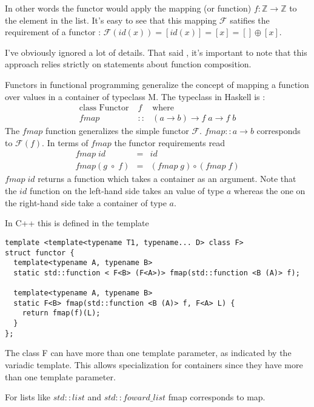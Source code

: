 \documentclass[12pt,fleqn]{article}
\begin{document}
In other words the functor would apply the mapping (or function) $f : \mathbb{Z} \rightarrow \mathbb{Z}$ to the element in the list.
It's easy to see that this mapping $\mathcal{F}$ satifies the requirement of a functor : $\mathcal{F} (id(x)) = [id(x)] = [x] = [] \oplus [x]$.


I've obviously ignored a lot of details.
That said , it's important to note that this approach relies strictly on statements about function composition.
 

Functors in functional programming generalize the concept of mapping a function over values in a container of typeclass M.
The typeclass in Haskell is :
\begin{eqnarray*}
\mbox{class Functor}\; &f& \mbox{where} \\
fmap &::& (a \rightarrow b) \rightarrow f\;a \rightarrow f\;b
\end{eqnarray*}
The $fmap$ function generalizes the simple functor $\mathcal{F}$. 
$fmap::a \rightarrow b$ corresponds to $\mathcal{F}(f)$.
In terms of $fmap$ the functor requirements read 
\begin{eqnarray*}
fmap \; id &=& id  \\
fmap (g \; \circ \; f) &=& (fmap \;g) \circ (fmap \;f) 
\end{eqnarray*}
$fmap \; id$ returns a function which takes a container as an argument.
Note that the $id$ function on the left-hand side takes an value of type $a$ whereas the one on the right-hand side take a container of type $a$.


In C++ this is defined in the template 
\begin{lstlisting}
template <template<typename T1, typename... D> class F>
struct functor {
  template<typename A, typename B>
  static std::function < F<B> (F<A>)> fmap(std::function <B (A)> f);

  template<typename A, typename B>
  static F<B> fmap(std::function <B (A)> f, F<A> L) {
    return fmap(f)(L);
  }
};
\end{lstlisting}
The class F can have more than one template parameter, as indicated by the variadic template.
This allows specialization for containers since they have more than one template parameter.

For lists like $std::list$ and $std::foward\_list$ fmap corresponds to map.

\begin{comment}
\begin{lstlisting}[caption=fmap for , label=listing_fmap ]
template <template<typename T1, typename... D> class F>
struct functor {

  //curried version
  template<typename A, typename B>
  static std::function < F<B> (F<A>)> fmap(std::function <B (A)> f);

  // uncurried, for functions..
  template<typename A, typename B>
  static F<B> fmap(std::function <B (A)> f, F<A> L) {
    return fmap(f)(L);
  }
};
\end{lstlisting}
\end{comment}
\end{document}
